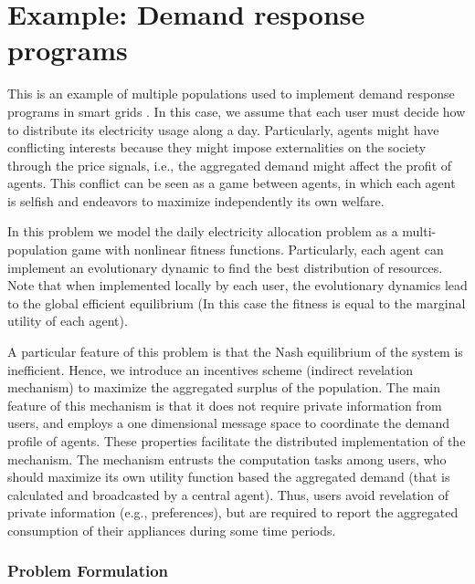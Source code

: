 
 \FloatBarrier

\section{Example: Demand response programs}\label{sec:dr_example}

This is an example of multiple populations used to implement demand response programs in smart grids \cite{barreto2013design, barreto2014incentives}. In this case, we assume that each user must decide how to distribute its electricity usage along a day. Particularly, 
agents might have conflicting interests because they might impose externalities on the society through the price signals, i.e., the aggregated demand might affect the profit of agents. This conflict can be seen as a game between agents, in which each agent is selfish and  endeavors to maximize independently its own welfare. 

In this problem we model the daily electricity allocation problem as a multi-population game with nonlinear fitness functions. Particularly, each agent can implement an evolutionary dynamic to find the best distribution of resources. Note that when implemented locally by each user, the evolutionary dynamics lead to the global efficient equilibrium (In this case the fitness is equal to the marginal utility of each agent). 

A particular feature of this problem is that the Nash equilibrium of the system is inefficient. Hence, 
we introduce an incentives scheme (indirect revelation mechanism) to maximize the aggregated surplus of the population.
The main feature of this mechanism is that it does not require private information from users, and employs a one dimensional message space to coordinate the demand profile of agents. These properties facilitate the distributed implementation of the mechanism. The mechanism entrusts the computation tasks among users, who should maximize its own utility function based the aggregated demand (that is calculated and broadcasted by a central agent). Thus, users avoid revelation of private information (e.g., preferences), but are required to report the aggregated consumption of their appliances during some time periods.







\subsubsection{Problem Formulation}




